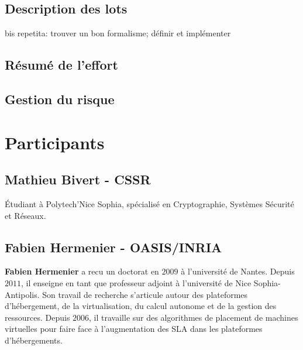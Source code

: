 \documentclass[a4paper]{article}
\begin{document}
\subsection{Description des lots}
bis repetita: trouver un bon formalisme; définir et implémenter
\subsection{Résumé de l'effort}
\subsection{Gestion du risque}

\section{Participants}
\subsection{Mathieu Bivert - CSSR}
Étudiant à Polytech'Nice Sophia, spécialisé en Cryptographie, Systèmes
Sécurité et Réseaux.

\subsection{Fabien Hermenier - OASIS/INRIA}
\textbf{Fabien Hermenier} a recu un doctorat en $2009$ à l'université
de Nantes. Depuis $2011$, il enseigne en tant que professeur adjoint
à l'université de Nice Sophia-Antipolis. Son travail de recherche
s'articule autour des plateformes d'hébergement, de la virtualisation,
du calcul autonome et de la gestion des ressources. Depuis $2006$, il
travaille sur des algorithmes de placement de machines virtuelles pour
faire face à l'augmentation des SLA dans les plateformes d'hébergements.

\newpage
{}


\end{document}
